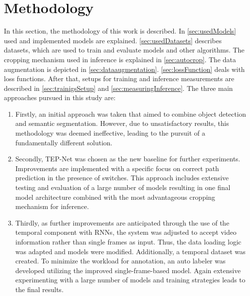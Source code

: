 \chapter{Methodology}
\label{sec:methodology}


In this section, the methodology of this work is described.
In \autoref{sec:usedModels} used and implemented models are explained.
\autoref{sec:usedDatasets} describes datasets, which are used to train and evaluate models and other algorithms.
The cropping mechanism used in inference is explained in \autoref{sec:autocrop}.
The data augmentation is depicted in \autoref{sec:dataaugmentation}.
\autoref{sec:lossFunction} deals with loss functions.
After that, setups for training and inference measurements are described in \autoref{sec:trainigsSetup} and \autoref{sec:measuringInference}.
The three main approaches pursued in this study are:


\begin{enumerate}
    \item Firstly, an initial approach was taken that aimed to combine object detection and semantic segmentation.
    However, due to unsatisfactory results, this methodology was deemed ineffective, leading to the pursuit of a fundamentally different solution.
    \item Secondly, \ac{TEP}-Net \cite{tepNet2024} was chosen as the new baseline for further experiments.
    Improvements are implemented with a specific focus on correct path prediction in the presence of switches. This approach includes extensive testing and evaluation of a large number of models resulting in one final model architecture combined with the most advantageous cropping mechanism for inference.
    \item Thirdly, as further improvements are anticipated through the use of the temporal component with \ac{RNN}s, the system was adjusted to accept video information rather than single frames as input.
    Thus, the data loading logic was adapted and models were modified.
    Additionally, a temporal dataset was created.
    To minimize the workload for annotation, an auto labeler was developed utilizing the improved single-frame-based model.
    Again extensive experimenting with a large number of models and training strategies leads to the final results.
\end{enumerate}


